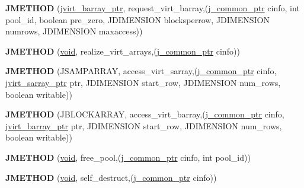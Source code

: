 \begin{DoxyCompactItemize}
\item 
\mbox{\label{structjpeg__memory__mgr_aee93326ad6a64714443e90044614d2a6}} 
{\bfseries J\+M\+E\+T\+H\+OD} (\hyperlink{structjvirt__barray__control}{jvirt\+\_\+barray\+\_\+ptr}, request\+\_\+virt\+\_\+barray,(\hyperlink{structjpeg__common__struct}{j\+\_\+common\+\_\+ptr} cinfo, int pool\+\_\+id, boolean pre\+\_\+zero, J\+D\+I\+M\+E\+N\+S\+I\+ON blocksperrow, J\+D\+I\+M\+E\+N\+S\+I\+ON numrows, J\+D\+I\+M\+E\+N\+S\+I\+ON maxaccess))
\item 
\mbox{\label{structjpeg__memory__mgr_a35cc0c3b3ecbc7209cdc23b2255932d8}} 
{\bfseries J\+M\+E\+T\+H\+OD} (\hyperlink{interfacevoid}{void}, realize\+\_\+virt\+\_\+arrays,(\hyperlink{structjpeg__common__struct}{j\+\_\+common\+\_\+ptr} cinfo))
\item 
\mbox{\label{structjpeg__memory__mgr_a747ad4316a4794b13f9fdff4f6f699ca}} 
{\bfseries J\+M\+E\+T\+H\+OD} (J\+S\+A\+M\+P\+A\+R\+R\+AY, access\+\_\+virt\+\_\+sarray,(\hyperlink{structjpeg__common__struct}{j\+\_\+common\+\_\+ptr} cinfo, \hyperlink{structjvirt__sarray__control}{jvirt\+\_\+sarray\+\_\+ptr} ptr, J\+D\+I\+M\+E\+N\+S\+I\+ON start\+\_\+row, J\+D\+I\+M\+E\+N\+S\+I\+ON num\+\_\+rows, boolean writable))
\item 
\mbox{\label{structjpeg__memory__mgr_aa460f4b500825e051306b8ce5583d052}} 
{\bfseries J\+M\+E\+T\+H\+OD} (J\+B\+L\+O\+C\+K\+A\+R\+R\+AY, access\+\_\+virt\+\_\+barray,(\hyperlink{structjpeg__common__struct}{j\+\_\+common\+\_\+ptr} cinfo, \hyperlink{structjvirt__barray__control}{jvirt\+\_\+barray\+\_\+ptr} ptr, J\+D\+I\+M\+E\+N\+S\+I\+ON start\+\_\+row, J\+D\+I\+M\+E\+N\+S\+I\+ON num\+\_\+rows, boolean writable))
\item 
\mbox{\label{structjpeg__memory__mgr_a7e7e063767441999982d22c5cc0e9423}} 
{\bfseries J\+M\+E\+T\+H\+OD} (\hyperlink{interfacevoid}{void}, free\+\_\+pool,(\hyperlink{structjpeg__common__struct}{j\+\_\+common\+\_\+ptr} cinfo, int pool\+\_\+id))
\item 
\mbox{\label{structjpeg__memory__mgr_ae80ddea0ba4f845f91d3a30e350b5f44}} 
{\bfseries J\+M\+E\+T\+H\+OD} (\hyperlink{interfacevoid}{void}, self\+\_\+destruct,(\hyperlink{structjpeg__common__struct}{j\+\_\+common\+\_\+ptr} cinfo))
\end{DoxyCompactItemize}
